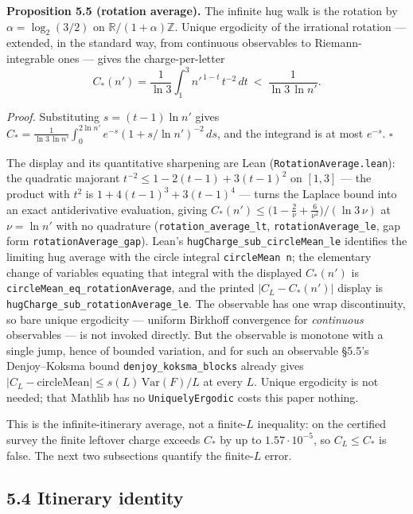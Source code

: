 \documentclass[12pt]{article}
\begin{document}
\textbf{Proposition 5.5 (rotation average).} The infinite hug walk is
the rotation by \(\alpha=\log_2(3/2)\) on
\(\mathbb R/(1+\alpha)\mathbb Z\). Unique ergodicity of the irrational
rotation --- extended, in the standard way, from continuous observables
to Riemann-integrable ones --- gives the charge-per-letter \[
C_*(n')=\frac1{\ln 3}\int_1^3 n'^{\,1-t}\,t^{-2}\,dt
\ <\ \frac1{\ln 3\,\ln n'} .
\]

\emph{Proof.} Substituting \(s=(t-1)\ln n'\) gives
\(C_*=\frac1{\ln 3\,\ln n'}\int_0^{2\ln n'}
e^{-s}(1+s/\ln n')^{-2}\,ds\), and the integrand is at most \(e^{-s}\).
\(\square\)

The display and its quantitative sharpening are Lean
(\texttt{\nolinkurl{RotationAverage.lean}}): the quadratic majorant
\(t^{-2}\le 1-2(t-1)+3(t-1)^2\) on \([1,3]\) --- the product with
\(t^2\) is \(1+4(t-1)^3+3(t-1)^4\) --- turns the Laplace bound into an
exact antiderivative evaluation, giving
\(C_*(n')\le\bigl(1-\tfrac2\nu+\tfrac6{\nu^2}\bigr)/(\ln 3\,\nu)\) at
\(\nu=\ln n'\) with no quadrature
(\texttt{\nolinkurl{rotation_average_lt}},
\texttt{\nolinkurl{rotationAverage_le}}, gap form
\texttt{\nolinkurl{rotationAverage_gap}}). Lean's
\texttt{\nolinkurl{hugCharge_sub_circleMean_le}} identifies the limiting
hug average with the circle integral
\texttt{circleMean\ n\textquotesingle{}}; the elementary change of
variables equating that integral with the displayed \(C_*(n')\) is
\texttt{\nolinkurl{circleMean_eq_rotationAverage}}, and the printed
\(|C_L-C_*(n')|\) display is
\texttt{\nolinkurl{hugCharge_sub_rotationAverage_le}}. The observable
has one wrap discontinuity, so bare unique ergodicity --- uniform
Birkhoff convergence for \emph{continuous} observables --- is not
invoked directly. But the observable is monotone with a single jump,
hence of bounded variation, and for such an observable §5.5's
Denjoy--Koksma bound \texttt{\nolinkurl{denjoy_koksma_blocks}} already
gives \(|C_L-\mathrm{circleMean}|\le s(L)\,\mathrm{Var}(F)/L\) at every
\(L\). Unique ergodicity is not needed; that Mathlib has no
\texttt{\nolinkurl{UniquelyErgodic}} costs this paper nothing.

This is the infinite-itinerary average, not a finite-\(L\) inequality:
on the certified survey the finite leftover charge exceeds \(C_*\) by up
to \(1.57\cdot 10^{-5}\), so \(C_L\le C_*\) is false. The next two
subsections quantify the finite-\(L\) error.

\subsection{5.4 Itinerary identity}\label{itinerary-identity}
\end{document}
